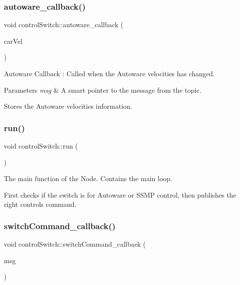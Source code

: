 \subsubsection{\texorpdfstring{autoware\+\_\+callback()}{autoware\_callback()}}
{\footnotesize\ttfamily void control\+Switch\+::autoware\+\_\+callback (\begin{DoxyParamCaption}\item[{const geometry\+\_\+msgs\+::\+Twist\+Stamped\+::\+Const\+Ptr \&}]{car\+Vel }\end{DoxyParamCaption})\hspace{0.3cm}{\ttfamily [inline]}}



Autoware Callback \+: Called when the Autoware velocities has changed. 


\begin{DoxyParams}{Parameters}
{\em msg} & A smart pointer to the message from the topic.\\
\hline
\end{DoxyParams}
Stores the Autoware velocities information. \mbox{\label{classcontrolSwitch_a8ff7cb526a5f0e5961fca446ae3d897d}} 
\subsubsection{\texorpdfstring{run()}{run()}}
{\footnotesize\ttfamily void control\+Switch\+::run (\begin{DoxyParamCaption}{ }\end{DoxyParamCaption})\hspace{0.3cm}{\ttfamily [inline]}}



The main function of the Node. Contains the main loop. 

First checks if the switch is for Autoware or S\+S\+MP control, then publishes the right controls command. \mbox{\label{classcontrolSwitch_adc4f5d2629e3c5ee7b2f87a308066bc0}} 
\subsubsection{\texorpdfstring{switch\+Command\+\_\+callback()}{switchCommand\_callback()}}
{\footnotesize\ttfamily void control\+Switch\+::switch\+Command\+\_\+callback (\begin{DoxyParamCaption}\item[{const std\+\_\+msgs\+::\+Int32\+::\+Const\+Ptr \&}]{msg }\end{DoxyParamCaption})\hspace{0.3cm}{\ttfamily [inline]}}




